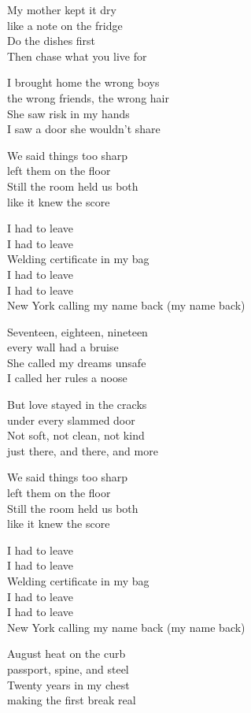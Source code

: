 \begin{lyrics}
My mother kept it dry\\
like a note on the fridge\\
Do the dishes first\\
Then chase what you live for

I brought home the wrong boys\\
the wrong friends, the wrong hair\\
She saw risk in my hands\\
I saw a door she wouldn't share

We said things too sharp\\
left them on the floor\\
Still the room held us both\\
like it knew the score

I had to leave\\
I had to leave\\
Welding certificate in my bag\\
I had to leave\\
I had to leave\\
New York calling my name back (my name back)

Seventeen, eighteen, nineteen\\
every wall had a bruise\\
She called my dreams unsafe\\
I called her rules a noose

But love stayed in the cracks\\
under every slammed door\\
Not soft, not clean, not kind\\
just there, and there, and more

We said things too sharp\\
left them on the floor\\
Still the room held us both\\
like it knew the score

I had to leave\\
I had to leave\\
Welding certificate in my bag\\
I had to leave\\
I had to leave\\
New York calling my name back (my name back)

August heat on the curb\\
passport, spine, and steel\\
Twenty years in my chest\\
making the first break real


\end{lyrics}
